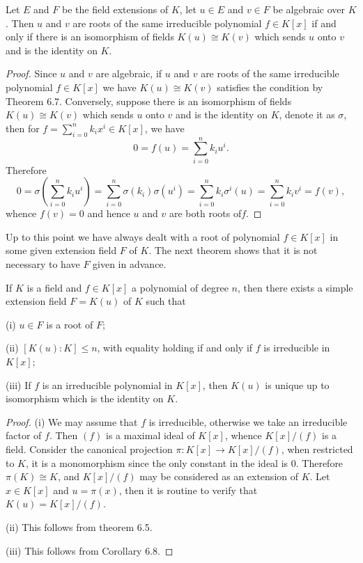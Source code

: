 \begin{corollary}
Let $E$ and $F$ be the field extensions of $K$, let $u\in E$ and $v\in F$ be algebraic over $K$. Then $u$ and $v$ are roots of the same irreducible polynomial $f\in K[x]$ if and only if there is an isomorphism of fields $K(u)\cong K(v)$ which sends $u$ onto $v$ and is the identity on $K$.
\end{corollary}
\begin{proof}
Since $u$ and $v$ are algebraic, if $u$ and $v$ are roots of the same irreducible polynomial $f\in K[x]$ we have $K(u)\cong K(v)$ satisfies the condition by Theorem 6.7. Conversely, suppose there is an isomorphism of fields $K(u)\cong K(v)$ which sends $u$ onto $v$ and is the identity on $K$, denote it as $\sigma$, then for $f=\sum_{i=0}^nk_ix^i\in K[x]$, we have 
$$0=f(u)=\sum_{i=0}^nk_iu^i.$$
Therefore 
$$
0=\sigma \left( \sum_{i=0}^n{k_iu^i} \right) =\sum_{i=0}^n{\sigma \left( k_i \right) \sigma \left( u^i \right)}=\sum_{i=0}^n{k_i\sigma ^i\left( u \right)}=\sum_{i=0}^n{k_iv^i}=f\left( v \right) ,
$$
whence $f(v)=0$ and hence $u$ and $v$ are both roots of$f$.
\end{proof}
Up to this point we have always dealt with a root of polynomial $f\in K[x]$ in some given extension field $F$ of $K$. The next theorem shows that it is not necessary to have $F$ given in advance.
\begin{theorem}
If $K$ is a field and $f\in K[x]$ a polynomial of degree $n$, then there exists a simple extension field $F=K(u)$ of $K$ such that \par
(i) $u\in F$ is a root of $F$;\par
(ii) $[K(u):K]\le n$, with equality holding if and only if $f$ is irreducible in $K[x]$;\par
(iii) If $f$ is an irreducible polynomial in $K[x]$, then $K(u)$ is unique up to isomorphism which is the identity on $K$.
\end{theorem}
\begin{proof}
(i) We may assume that $f$ is irreducible, otherwise we take an irreducible factor of $f$. Then $(f)$ is a maximal ideal of $K[x]$, whence $K[x]/(f)$ is a field. Consider the canonical projection $\pi:K[x]\to K[x]/(f)$, when restricted to $K$, it is a monomorphism since the only constant in the ideal is $0$. Therefore $\pi(K)\cong K$, and $K[x]/(f)$ may be considered as an extension of $K$. Let $x\in K[x]$ and $u=\pi(x)$, then it is routine to verify that $K(u)=K[x]/(f)$.\par
(ii) This follows from theorem 6.5.\par
(iii) This follows from Corollary 6.8.
\end{proof}
